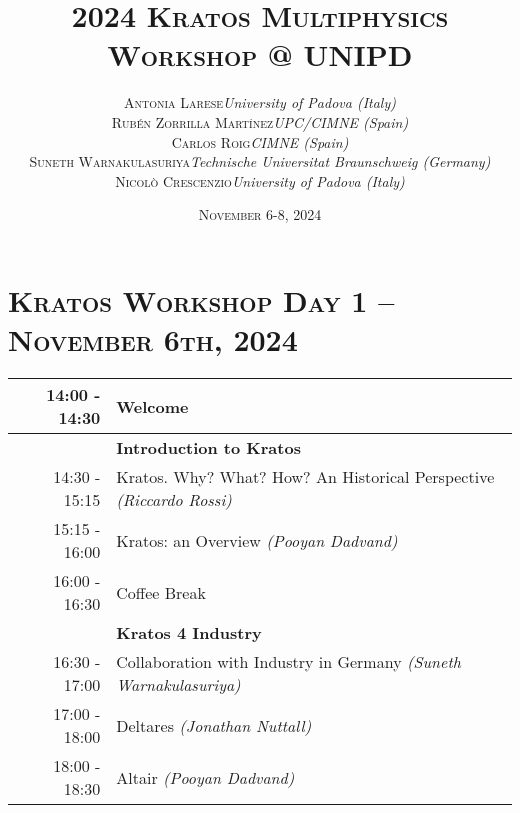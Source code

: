 \documentclass{article}
\begin{document}
\title{
   \Huge
   2024 \textsc{Kratos Multiphysics\\Workshop @ UNIPD}
}
\author{
   \small
   \begin{tabular}{rl}
      \textsc{Antonia Larese} & \textit{University of Padova (Italy)} \\
      \textsc{Rubén Zorrilla Martínez} & \textit{UPC/CIMNE (Spain)} \\
      \textsc{Carlos Roig} & \textit{CIMNE (Spain)} \\
      \textsc{Suneth Warnakulasuriya} & \textit{Technische Universitat Braunschweig (Germany)} \\
      \textsc{Nicol\`o Crescenzio} & \textit{University of Padova (Italy)}
   \end{tabular}
}
\date{\textsc{November} 6-8, 2024}
\maketitle

\renewcommand{\arraystretch}{1.5}

\section*{\centering\textsc{Kratos Workshop Day 1 -- November 6th, 2024}}

\begin{table}[h]\centering
   \begin{tabularx}{0.85\textwidth}{r|X}
      \toprule%
      \rowcolor{SeaGreen3!5!} 14:00 - 14:30 & Welcome \\%
      \midrule%
                    & {\large \textbf{Introduction to Kratos}} \\%
      14:30 - 15:15 & Kratos. Why? What? How? An Historical Perspective \textit{(Riccardo Rossi)}\\%
      15:15 - 16:00 & Kratos: an Overview \textit{(Pooyan Dadvand)}\\%
      \midrule%
      \rowcolor{SeaGreen3!5!} 16:00 - 16:30 & Coffee Break \\%
      \midrule%
                    & {\large \textbf{Kratos 4 Industry}} \\%
      16:30 - 17:00 & Collaboration with Industry in Germany \textit{(Suneth Warnakulasuriya)}\\%
      17:00 - 18:00 & Deltares \textit{(Jonathan Nuttall)}\\%
      18:00 - 18:30 & Altair \textit{(Pooyan Dadvand)}\\%
      \bottomrule
   \end{tabularx}
\end{table}
\end{document}

